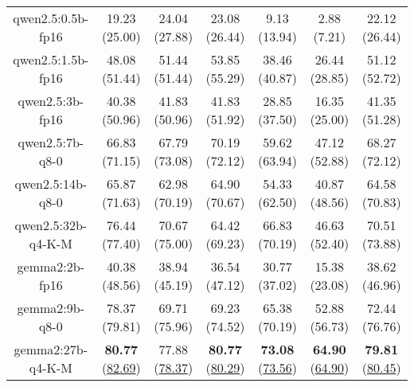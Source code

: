 \begin{table}[hbp]
{\begin{tabular}{ccccccc}
        \multicolumn{1}{c|}{qwen2.5:0.5b-fp16} & 19.23 (25.00) & 24.04 (27.88) & \multicolumn{1}{c|}{23.08 (26.44)} & 9.13 (13.94) & \multicolumn{1}{c|}{2.88 (7.21)} & 22.12 (26.44) \\
        

        \multicolumn{1}{c|}{qwen2.5:1.5b-fp16} & 48.08 (51.44) & 51.44 (51.44) & \multicolumn{1}{c|}{53.85 (55.29)} & 38.46 (40.87) & \multicolumn{1}{c|}{26.44 (28.85)} & 51.12 (52.72) \\
        

        \multicolumn{1}{c|}{qwen2.5:3b-fp16} & 40.38 (50.96) & 41.83 (50.96) & \multicolumn{1}{c|}{41.83 (51.92)} & 28.85 (37.50) & \multicolumn{1}{c|}{16.35 (25.00)} & 41.35 (51.28) \\
        

        \multicolumn{1}{c|}{qwen2.5:7b-q8-0} & 66.83 (71.15) & 67.79 (73.08) & \multicolumn{1}{c|}{70.19 (72.12)} & 59.62 (63.94) & \multicolumn{1}{c|}{47.12 (52.88)} & 68.27 (72.12) \\
        

        \multicolumn{1}{c|}{qwen2.5:14b-q8-0} & 65.87 (71.63) & 62.98 (70.19) & \multicolumn{1}{c|}{64.90 (70.67)} & 54.33 (62.50) & \multicolumn{1}{c|}{40.87 (48.56)} & 64.58 (70.83) \\
        

        \multicolumn{1}{c|}{qwen2.5:32b-q4-K-M} & 76.44 (77.40) & 70.67 (75.00) & \multicolumn{1}{c|}{64.42 (69.23)} & 66.83 (70.19) & \multicolumn{1}{c|}{46.63 (52.40)} & 70.51 (73.88) \\
        

        \multicolumn{1}{c|}{gemma2:2b-fp16} & 40.38 (48.56) & 38.94 (45.19) & \multicolumn{1}{c|}{36.54 (47.12)} & 30.77 (37.02) & \multicolumn{1}{c|}{15.38 (23.08)} & 38.62 (46.96) \\
        

        \multicolumn{1}{c|}{gemma2:9b-q8-0} & 78.37 (79.81) & 69.71 (75.96) & \multicolumn{1}{c|}{69.23 (74.52)} & 65.38 (70.19) & \multicolumn{1}{c|}{52.88 (56.73)} & 72.44 (76.76) \\
        

        \multicolumn{1}{c|}{gemma2:27b-q4-K-M} & \textbf{80.77} (\underline{82.69}) & 77.88 (\underline{78.37}) & \multicolumn{1}{c|}{\textbf{80.77} (\underline{80.29})} & \textbf{73.08} (\underline{73.56}) & \multicolumn{1}{c|}{\textbf{64.90} (\underline{64.90})} & \textbf{79.81} (\underline{80.45}) \\
        


\end{tabular}}
\end{table}
